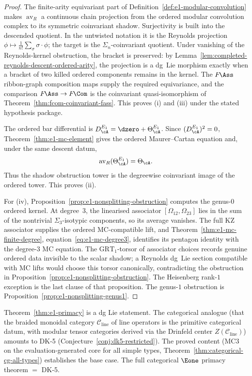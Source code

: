\begin{proof}
The finite-arity equivariant part of
Definition~\ref{def:e1-modular-convolution} makes
$\operatorname{av}_R$ a continuous chain projection from the ordered
modular convolution complex to its symmetric coinvariant shadow.
Surjectivity is built into the descended quotient. In the untwisted
notation it is the Reynolds projection
$\phi \mapsto \frac{1}{n!}\sum_{\sigma} \sigma \cdot \phi$; the target
is the $\Sigma_n$-coinvariant quotient. Under vanishing of the
Reynolds-kernel obstruction, the bracket is preserved: by
Lemma~\ref{lem:completed-reynolds-descent-ordered-arity}, the projection
is a dg~Lie morphism exactly when a bracket of two killed ordered
components remains in the kernel. The $F\!\Ass$ ribbon-graph
composition maps supply the required equivariance, and the comparison
$F\!\Ass\to F\!\Com$ is the coinvariant quasi-isomorphism of
Theorem~\ref{thm:fcom-coinvariant-fass}. This proves \textup{(i)} and
\textup{(iii)} under the stated hypothesis package.

The ordered bar differential is
$D_\cA^{E_1}=\dzero+\Theta_\cA^{E_1}$. Since
$(D_\cA^{E_1})^2=0$, Theorem~\ref{thm:e1-mc-element} gives the
ordered Maurer--Cartan equation and, under the same descent datum,
\[
\operatorname{av}_R(\Theta_\cA^{E_1})=\Theta_\cA .
\]
Thus the shadow obstruction tower is the degreewise coinvariant image
of the ordered tower. This proves \textup{(ii)}.

For \textup{(iv)}, Proposition~\ref{prop:e1-nonsplitting-obstruction}
computes the genus-$0$ ordered kernel. At degree~$3$, the linearised
associator $[\Omega_{12},\Omega_{23}]$ lies in the sum of the
nontrivial $\Sigma_3$-isotypic components, so its average vanishes. The full KZ
associator supplies the ordered MC-compatible lift, and
Theorem~\ref{thm:e1-mc-finite-degree},
equation~\eqref{eq:e1-mc-degree3}, identifies its pentagon identity
with the degree-$3$ MC equation. The $\mathrm{GRT}_1$-torsor of
associator choices records genuine ordered data invisible to the
scalar shadow; a Reynolds dg~Lie section compatible with MC lifts would
choose this torsor canonically, contradicting the obstruction in
Proposition~\ref{prop:e1-nonsplitting-obstruction}. The Heisenberg
rank-$1$ exception is the last clause of that proposition. The
genus-$1$ obstruction is Proposition~\ref{prop:e1-nonsplitting-genus1}.
\end{proof}

\begin{remark}
\label{rem:categorical-e1-primacy}
Theorem~\ref{thm:e1-primacy} is a dg Lie statement. The categorical
analogue (that the braided monoidal category $\mathcal{C}_{\mathrm{line}}$
of line operators is the primitive categorical datum, with modular tensor
categories derived via the Drinfeld center
$Z(\mathcal{C}_{\mathrm{line}})$) amounts to DK-5
(Conjecture~\ref{conj:dk5-restricted}). The proved content (MC3 on the
evaluation-generated core for all simple types,
Theorem~\ref{thm:categorical-cg-all-types}) establishes the base case.
The full categorical $\Eone$ primacy theorem $=$ DK-5.
\end{remark}

